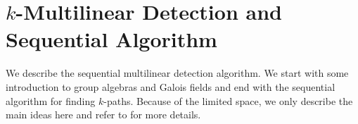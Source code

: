 

\section{$k$-Multilinear Detection and Sequential Algorithm}
\label{sec:kMD}
We describe the sequential multilinear detection algorithm. We start with some introduction to group algebras and Galois fields and end with the sequential algorithm for finding $k$-paths.
Because of the limited space, we only describe the main ideas here and refer to \cite{koutis:icalp08, williams2009finding} for more details. 

